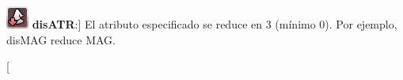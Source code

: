 \begin{description}[leftmargin=*]
{		\includegraphics[width=\baselineskip]{./art/icons/deshell.png}} \textbf{disATR}:] El atributo especificado se reduce en 3 (mínimo 0). Por ejemplo, disMAG reduce MAG. \item[\large\color{accent} 
\end{description}
